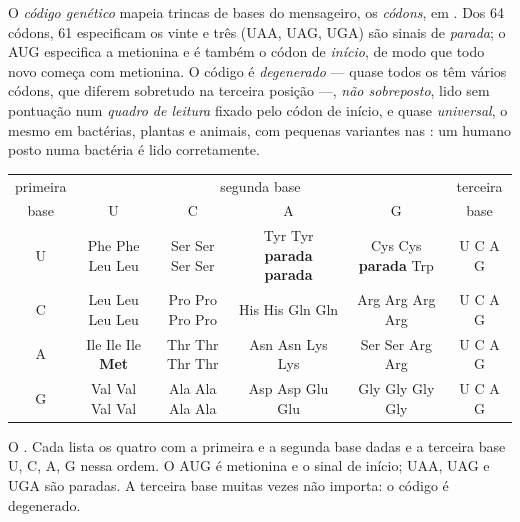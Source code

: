 \begin{definition}\label{def:b1:gene-expression:code}
O \emph{código genético} mapeia trincas de bases do mensageiro, os
\emph{códons}, em . Dos 64 códons, 61 especificam os vinte
 e três (UAA, UAG, UGA) são sinais de \emph{parada}; o AUG
especifica a metionina e é também o códon de \emph{início}, de modo que
todo  novo começa com metionina. O código é
\emph{degenerado} --- quase todos os  têm vários códons, que
diferem sobretudo na terceira posição ---, \emph{não sobreposto}, lido
sem pontuação num \emph{quadro de leitura} fixado pelo códon de início,
e quase \emph{universal}, o mesmo em bactérias, plantas e animais, com
pequenas variantes nas : um  humano posto numa bactéria
é lido corretamente.
\end{definition}

\begin{omfigure}
\begin{center}
\scriptsize
\begin{tabular}{c|cccc|c}
\hline
primeira & \multicolumn{4}{c|}{segunda base} & terceira \\
base & U & C & A & G & base \\
\hline
U & Phe Phe Leu Leu & Ser Ser Ser Ser & Tyr Tyr \textbf{parada} \textbf{parada} & Cys Cys \textbf{parada} Trp & U C A G \\
C & Leu Leu Leu Leu & Pro Pro Pro Pro & His His Gln Gln & Arg Arg Arg Arg & U C A G \\
A & Ile Ile Ile \textbf{Met} & Thr Thr Thr Thr & Asn Asn Lys Lys & Ser Ser Arg Arg & U C A G \\
G & Val Val Val Val & Ala Ala Ala Ala & Asp Asp Glu Glu & Gly Gly Gly Gly & U C A G \\
\hline
\end{tabular}
\end{center}

{\small O . Cada  lista os quatro  com a
primeira e a segunda base dadas e a terceira base U, C, A, G nessa
ordem. O AUG é metionina e o sinal de início; UAA, UAG e UGA são
paradas. A terceira base muitas vezes não importa: o código é
degenerado.}
\end{omfigure}

